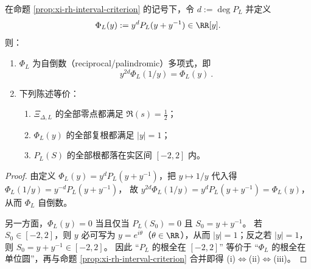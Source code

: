 \begin{corollary}\label{cor:xi-rh-unit-circle-reciprocal}
在命题 \ref{prop:xi-rh-interval-criterion} 的记号下，令 \(d:=\deg P_L\) 并定义
\[
\Phi_L(y):=y^{d}P_L(y+y^{-1})\in\RR[y].
\]
则：
\begin{enumerate}
  \item \(\Phi_L\) 为自倒数（reciprocal/palindromic）多项式，即
  \[
  \boxed{\ y^{2d}\Phi_L(1/y)=\Phi_L(y)\ }.
  \]
  \item 下列陈述等价：
  \begin{enumerate}
    \item[(i)] \(\Xi_{\Delta,L}\) 的全部零点都满足 \(\Re(s)=\tfrac12\)；
    \item[(ii)] \(\Phi_L(y)\) 的全部复根都满足 \(|y|=1\)；
    \item[(iii)] \(P_L(S)\) 的全部根都落在实区间 \([-2,2]\) 内。
  \end{enumerate}
\end{enumerate}
\end{corollary}
\begin{proof}
由定义 \(\Phi_L(y)=y^{d}P_L(y+y^{-1})\)，把 \(y\mapsto 1/y\) 代入得
\(
\Phi_L(1/y)=y^{-d}P_L(y+y^{-1})
\)，
故 \(y^{2d}\Phi_L(1/y)=y^{d}P_L(y+y^{-1})=\Phi_L(y)\)，从而 \(\Phi_L\) 自倒数。
\par
另一方面，\(\Phi_L(y)=0\) 当且仅当 \(P_L(S_0)=0\) 且 \(S_0=y+y^{-1}\)。
若 \(S_0\in[-2,2]\)，则 \(y\) 必可写为 \(y=e^{i\theta}\)（\(\theta\in\RR\)），从而 \(|y|=1\)；反之若 \(|y|=1\)，则 \(S_0=y+y^{-1}\in[-2,2]\)。
因此 “\(P_L\) 的根全在 \([-2,2]\)” 等价于 “\(\Phi_L\) 的根全在单位圆”，再与命题 \ref{prop:xi-rh-interval-criterion} 合并即得 (i)\(\Leftrightarrow\)(ii)\(\Leftrightarrow\)(iii)。
\end{proof}

